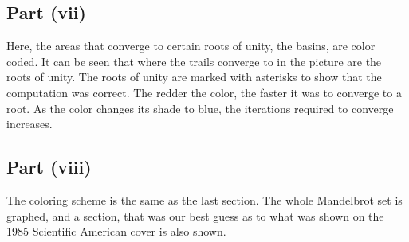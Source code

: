 \documentclass[12pt]{article}
\begin{document}
\subsection*{Part (vii)}
Here, the areas that converge to certain roots of unity, the basins, are color coded.
It can be seen that where the trails converge to in the picture are the roots of unity.
The roots of unity are marked with asterisks to show that the computation was correct.
The redder the color, the faster it was to converge to a root.
As the color changes its shade to blue, the iterations required 
to converge increases.

\subsection*{Part (viii)}
The coloring scheme is the same as the last section.
The whole Mandelbrot set is graphed, and a section, that was our best guess as to what was shown on the 1985 Scientific American cover is also shown.
\end{document}
